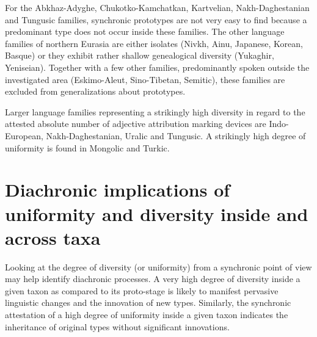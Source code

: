 For the Abkhaz-Adyghe, Chukotko-Kamchatkan, Kartvelian, Nakh\hyp{}Daghestanian and Tungusic families, synchronic prototypes are not very easy to find because a predominant type does not occur inside these families. The other language families of northern Eurasia are either isolates (Nivkh, Ainu, Japanese, Korean, Basque) or they exhibit rather shallow genealogical diversity (Yukaghir, Yeniseian). Together with a few other families, predominantly spoken outside the investigated area (Eskimo-Aleut, Sino-Tibetan, Semitic), these families are excluded from generalizations about prototypes. 

Larger language families representing a strikingly high diversity in regard to the attested absolute number of adjective attribution marking devices are Indo-European, Nakh\hyp{}Daghestanian, Uralic and Tungusic. A strikingly high degree of uniformity is found in Mongolic and Turkic.

\section[Diachronic implications]{Diachronic implications of uniformity and diversity inside and across taxa}
Looking at the degree of diversity (or uniformity) from a synchronic point of view may help identify diachronic processes. A very high degree of diversity inside a given taxon as compared to its proto-stage is likely to manifest pervasive linguistic changes and the innovation of new types. Similarly, the synchronic attestation of a high degree of uniformity inside a given taxon indicates the inheritance of original types without significant innovations. 

